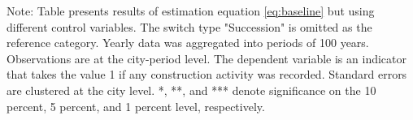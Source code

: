 \begin{table}[htbp]
\begin{tabular}{lcccc}
      
   \end{tabular}
   
   \par \raggedright 
   Note: Table presents results of estimation equation \eqref{eq:baseline} but using different control variables. The switch type  "Succession" is omitted as the reference category. Yearly data was aggregated into periods of 100 years. Observations are at the city-period level. The dependent variable is an  indicator that takes the value 1 if any construction activity was recorded.  Standard errors are clustered at the city level. *, **, and *** denote significance on the 10 percent, 5 percent, and 1 percent  level, respectively.
\end{table}

